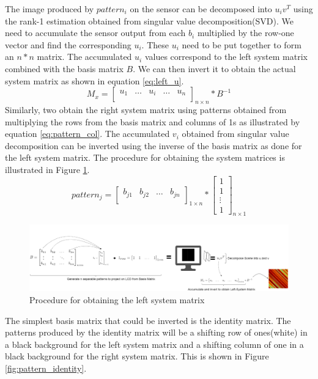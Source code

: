 The image produced by $pattern_i$ on the sensor can be decomposed into $u_iv^T$ using the rank-1 estimation obtained from singular value decomposition(SVD). We need to accumulate the sensor output from each $b_i$ multiplied by the row-one vector and find the corresponding $u_i$. These $u_i$ need to be put together to form an $n*n$ matrix. The accumulated $u_i$ values correspond to the left system matrix combined with the basis matrix $B$. We can then invert it to obtain the actual system matrix as shown in equation \ref{eq:left_u}.
\begin{equation}
M_x = \begin{bmatrix} 
    u_{1} & \dots & u_i &  \dots & u_n \\
  
    \end{bmatrix}_{n\times n} * B^{-1}
    \label{eq:left_u}
\end{equation}
Similarly, two obtain the right system matrix using patterns obtained from multiplying the rows from the basis matrix and columns of 1s as illustrated by equation \ref{eq:pattern_col}. The accumulated $v_i$ obtained from singular value decomposition can be inverted using the inverse of the basis matrix as done for the left system matrix. The procedure for obtaining the system matrices is illustrated in Figure \ref{fig:sys_est}.
\begin{equation}
pattern_{j} = \begin{bmatrix} 
    b_{j1} & b_{j2} & \dots &b_{jn}\\
    \end{bmatrix}_{1\times n} *
    \begin{bmatrix} 
    1\\
	1\\
    \vdots\\
    1
    \end{bmatrix}_{n\times 1}
  \label{eq:pattern_col}
\end{equation}

\begin{figure}[h]
\centering
\includegraphics[width = \linewidth]{pics/system_matrix_estimation.png}
\caption{Procedure for obtaining the left system matrix}
\label{fig:sys_est}
\end{figure}
The simplest basis matrix that could be inverted is the identity matrix. The patterns produced by the identity matrix will be a shifting row of ones(white) in a black background for the left system matrix and a shifting column of one in a black background for the right system matrix. This is shown in Figure \ref{fig:pattern_identity}.

